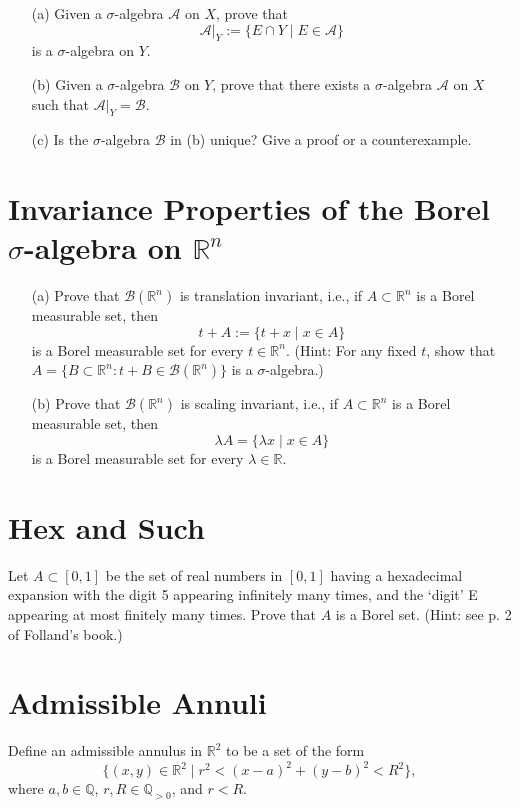 \documentclass[lang=cn,11pt]{elegantbook}
\begin{document}
\begin{itemize}
    \item[(a)] Given a $\sigma$-algebra $\mathcal{A}$ on $X$, prove that
    \[
    \mathcal{A}|_Y := \{E \cap Y \mid E \in \mathcal{A}\}
    \]
    is a $\sigma$-algebra on $Y$.
    \item[(b)] Given a $\sigma$-algebra $\mathcal{B}$ on $Y$, prove that there exists a $\sigma$-algebra $\mathcal{A}$ on $X$ such that $\mathcal{A}|_Y = \mathcal{B}$.
    \item[(c)] Is the $\sigma$-algebra $\mathcal{B}$ in (b) unique? Give a proof or a counterexample.
\end{itemize}

\section{Invariance Properties of the Borel $\sigma$-algebra on $\mathbb{R}^n$}
\begin{itemize}
    \item[(a)] Prove that $\mathcal{B}(\mathbb{R}^n)$ is translation invariant, i.e., if $A \subset \mathbb{R}^n$ is a Borel measurable set, then
    \[
    t + A := \{t + x \mid x \in A\}
    \]
    is a Borel measurable set for every $t \in \mathbb{R}^n$. (Hint: For any fixed $t$, show that $A = \{B \subset \mathbb{R}^n : t + B \in \mathcal{B}(\mathbb{R}^n)\}$ is a $\sigma$-algebra.)
    \item[(b)] Prove that $\mathcal{B}(\mathbb{R}^n)$ is scaling invariant, i.e., if $A \subset \mathbb{R}^n$ is a Borel measurable set, then
    \[
    \lambda A = \{\lambda x \mid x \in A\}
    \]
    is a Borel measurable set for every $\lambda \in \mathbb{R}$.
\end{itemize}

\section{Hex and Such}
Let $A \subset [0,1]$ be the set of real numbers in $[0,1]$ having a hexadecimal expansion with the digit 5 appearing infinitely many times, and the ‘digit’ E appearing at most finitely many times. Prove that $A$ is a Borel set. (Hint: see p. 2 of Folland’s book.)

\section{Admissible Annuli}
Define an admissible annulus in $\mathbb{R}^2$ to be a set of the form
\[
\{(x, y) \in \mathbb{R}^2 \mid r^2 < (x - a)^2 + (y - b)^2 < R^2\},
\]
where $a, b \in \mathbb{Q}$, $r, R \in \mathbb{Q}_{>0}$, and $r < R$.
\end{document}
